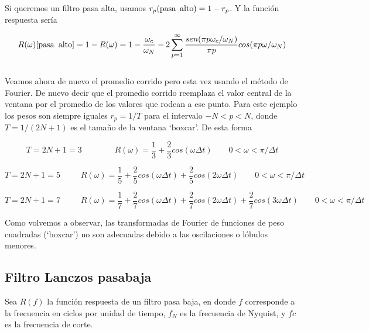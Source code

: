\documentclass[
]{agujournal2019}
\begin{document}
Si queremos un filtro pasa alta, usamos
\(r_p({\rm pasa}\,\,\,{\rm alto})=1-r_p\). Y la función respuesta sería

\[R(\omega)[{\rm pasa}\,\,\,{\rm alto}]=1-R(\omega)=1-\frac{\omega_c}{\omega_N} - 2\sum\limits^{\infty}_{p=1}
\frac{sen(\pi p \omega_c / \omega_N)}{\pi p}cos(\pi p \omega / \omega_N)\]\\
Veamos ahora de nuevo el promedio corrido pero esta vez usando el método
de Fourier. De nuevo decir que el promedio corrido reemplaza el valor
central de la ventana por el promedio de los valores que rodean a ese
punto. Para este ejemplo los pesos son siempre iguales \(r_p=1/T\) para
el intervalo \(-N<p<N\), donde \(T=1/(2N+1)\) es el tamaño de la ventana
`boxcar'. De esta forma ~

\[T=2N+1=3\,\,\,\,\,\,\,\,\,\,\,\,\,\,\,\,\,\,\,\,\,\,\,\,
R(\omega)=\frac{1}{3} + \frac{2}{3}cos(\omega \Delta t)
\,\,\,\,\,\,\,\,\,\,\,\,0<\omega<\pi/\Delta t\]

\[T=2N+1=5\,\,\,\,\,\,\,\,\,\,\,\,\,\,\,
R(\omega)=\frac{1}{5} + \frac{2}{5}cos(\omega \Delta t)+ \frac{2}{5}cos(2\omega \Delta t)
\,\,\,\,\,\,\,\,\,\,\,\,0<\omega<\pi/\Delta t\]

\[T=2N+1=7\,\,\,\,\,\,\,\,\,\,\,\,\,\,\,
R(\omega)=\frac{1}{7} + \frac{2}{7}cos(\omega \Delta t)+ \frac{2}{7}cos(2\omega \Delta t)+ \frac{2}{7}cos(3\omega \Delta t)
\,\,\,\,\,\,\,\,\,\,\,\,0<\omega<\pi/\Delta t\]

\begin{center}
\end{center}

Como volvemos a observar, las transformadas de Fourier de funciones de
peso cuadradas (`boxcar') no son adecuadas debido a las oscilaciones o
lóbulos menores.

\hypertarget{filtro-lanczos-pasabaja}{%
\subsection{Filtro Lanczos pasabaja}\label{filtro-lanczos-pasabaja}}

Sea \(R(f)\) la función respuesta de un filtro pasa baja, en donde \(f\)
corresponde a la frecuencia en ciclos por unidad de tiempo, \(f_N\) es
la frecuencia de Nyquist, y \(fc\) es la frecuencia de corte.

\begin{center}
\end{center}
\end{document}
